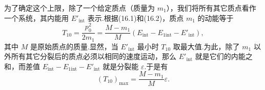 为了确定这个上限，除了一个给定质点（质量为 $m_1$），我们将所有其它质点看作一个系统，其内能用 $E'_\mathrm{int}$ 表示.根据(16.1)和(16.2)，质点 $m_1$ 的动能等于
\begin{equation*}
  T_{10}=\frac{p_0^2}{2m_1}
  =\frac{M-m_1}{M}\left(E_\mathrm{int}-E_{1\mathrm{int}}-E'_\mathrm{int}\right),
\end{equation*}
其中 $M$ 是原始质点的质量.显然，当 $E'_\mathrm{int}$ 最小时 $T_{10}$ 取最大值.为此，除了 $m_1$ 以外所有其它分裂后的质点必须以相同的速度运动，那么 $E'_\mathrm{int}$ 就是它们的内能之和，而差值 $E_\mathrm{int}-E_{1\mathrm{int}}-E'_\mathrm{int}$ 就是分裂能 $\varepsilon$.于是有
\begin{equation}
  \left(T_{10}\right)_\mathrm{max}=\frac{M-m_1}{M}\varepsilon.
\end{equation}

